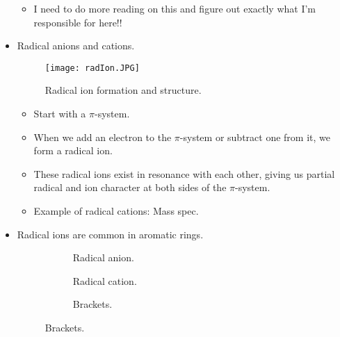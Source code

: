 \documentclass[../notes.tex]{subfiles}
\begin{document}
\begin{itemize}
\begin{itemize}
\begin{itemize}
\begin{itemize}
            \end{itemize}
        \end{itemize}
        \item I need to do more reading on this and figure out exactly what I'm responsible for here!!
    \end{itemize}
    \item Radical anions and cations.
    \begin{figure}[h!]
        \centering
        \texttt{[image: radIon.JPG]}
        \caption{Radical ion formation and structure.}
        \label{fig:radIon}
    \end{figure}
    \begin{itemize}
        \item Start with a $\pi$-system.
        \item When we add an electron to the $\pi$-system or subtract one from it, we form a radical ion.
        \item These radical ions exist in resonance with each other, giving us partial radical and ion character at both sides of the $\pi$-system.
        \item Example of radical cations: Mass spec.
    \end{itemize}
    \item Radical ions are common in aromatic rings.
    \begin{figure}[h!]
        \centering
        \footnotesize
        \begin{subfigure}[b]{0.2\linewidth}
            \centering
            \caption{Radical anion.}
            \label{fig:radIonArNota}
        \end{subfigure}
        \begin{subfigure}[b]{0.2\linewidth}
            \centering
            \caption{Radical cation.}
            \label{fig:radIonArNotb}
        \end{subfigure}
        \begin{subfigure}[b]{0.2\linewidth}
            \centering
            \caption{Brackets.}
            \label{fig:radIonArNotc}
        \end{subfigure}

\end{figure}
\end{itemize}
\end{document}
